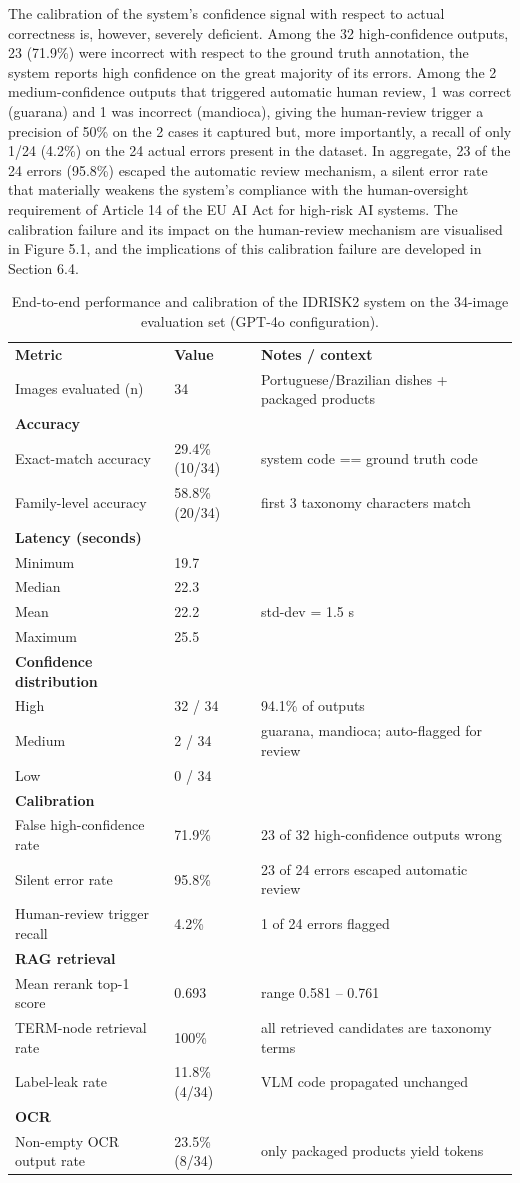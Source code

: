 The calibration of the system's confidence signal with respect to actual correctness is, however, severely deficient. Among the 32 high-confidence outputs, 23 (71.9\%) were incorrect with respect to the ground truth annotation, the system reports high confidence on the great majority of its errors. Among the 2 medium-confidence outputs that triggered automatic human review, 1 was correct (guarana) and 1 was incorrect (mandioca), giving the human-review trigger a precision of 50\% on the 2 cases it captured but, more importantly, a recall of only 1/24 (4.2\%) on the 24 actual errors present in the dataset. In aggregate, 23 of the 24 errors (95.8\%) escaped the automatic review mechanism, a silent error rate that materially weakens the system's compliance with the human-oversight requirement of Article 14 of the EU AI Act for high-risk AI systems. The calibration failure and its impact on the human-review mechanism are visualised in Figure 5.1, and the implications of this calibration failure are developed in Section 6.4.

\begin{longtable}[]{@{}lll@{}}
\caption{End-to-end performance and calibration of the IDRISK2 system on the 34-image evaluation set (GPT-4o configuration).}\label{tab:eval-calibration}\\
\toprule
\endhead
\textbf{Metric} & \textbf{Value} & \textbf{Notes / context}\tabularnewline
Images evaluated (n) & 34 & Portuguese/Brazilian dishes + packaged products\tabularnewline
\textbf{Accuracy} & &\tabularnewline
Exact-match accuracy & 29.4\% (10/34) & system code == ground truth code\tabularnewline
Family-level accuracy & 58.8\% (20/34) & first 3 taxonomy characters match\tabularnewline
\textbf{Latency (seconds)} & &\tabularnewline
Minimum & 19.7 &\tabularnewline
Median & 22.3 &\tabularnewline
Mean & 22.2 & std-dev = 1.5 s\tabularnewline
Maximum & 25.5 &\tabularnewline
\textbf{Confidence distribution} & &\tabularnewline
High & 32 / 34 & 94.1\% of outputs\tabularnewline
Medium & 2 / 34 & guarana, mandioca; auto-flagged for review\tabularnewline
Low & 0 / 34 &\tabularnewline
\textbf{Calibration} & &\tabularnewline
False high-confidence rate & 71.9\% & 23 of 32 high-confidence outputs wrong\tabularnewline
Silent error rate & 95.8\% & 23 of 24 errors escaped automatic review\tabularnewline
Human-review trigger recall & 4.2\% & 1 of 24 errors flagged\tabularnewline
\textbf{RAG retrieval} & &\tabularnewline
Mean rerank top-1 score & 0.693 & range 0.581 -- 0.761\tabularnewline
TERM-node retrieval rate & 100\% & all retrieved candidates are taxonomy terms\tabularnewline
Label-leak rate & 11.8\% (4/34) & VLM code propagated unchanged\tabularnewline
\textbf{OCR} & &\tabularnewline
Non-empty OCR output rate & 23.5\% (8/34) & only packaged products yield tokens\tabularnewline
\bottomrule
\end{longtable}


